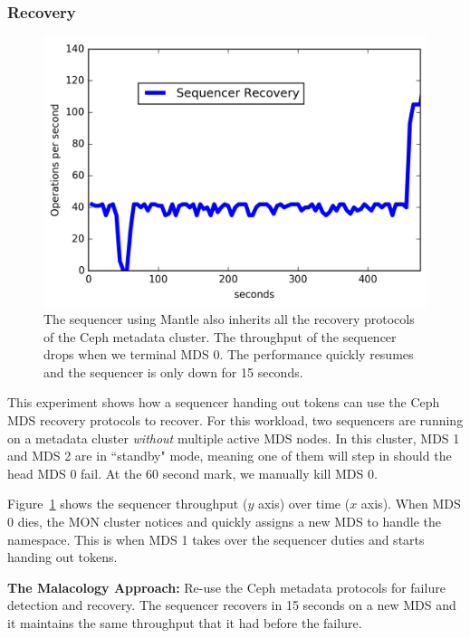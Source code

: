 \documentclass[10pt,twocolumn]{article}
\begin{document}
\subsubsection{Recovery}

\begin{figure}[t]
\centering
\includegraphics{figures/recovery-seq-thruput.png}
\caption{The sequencer using Mantle also inherits all the recovery protocols of
the Ceph metadata cluster. The throughput of the sequencer drops when we
terminal MDS 0. The performance quickly resumes and the sequencer is only down
for 15 seconds.}
\label{fig:recovery-seq-thruput}
\end{figure}

This experiment shows how a sequencer handing out tokens can use the Ceph MDS
recovery protocols to recover. For this workload, two sequencers are running on
a metadata cluster {\it without} multiple active MDS nodes. In this cluster,
MDS 1 and MDS 2 are in ``standby" mode, meaning one of them will step in should
the head MDS 0 fail. At the 60 second mark, we manually kill MDS 0. 

Figure~\ref{fig:recovery-seq-thruput} shows the sequencer throughput (\(y\)
axis) over time (\(x\) axis). When MDS 0 dies, the MON cluster notices and
quickly assigns a new MDS to handle the namespace. This is when MDS 1 takes
over the sequencer duties and starts handing out tokens.

\textbf{The Malacology Approach:} Re-use the Ceph metadata protocols for
failure detection and recovery. The sequencer recovers in 15 seconds on a new
MDS and it maintains the same throughput that it had before the failure.
\end{document}
